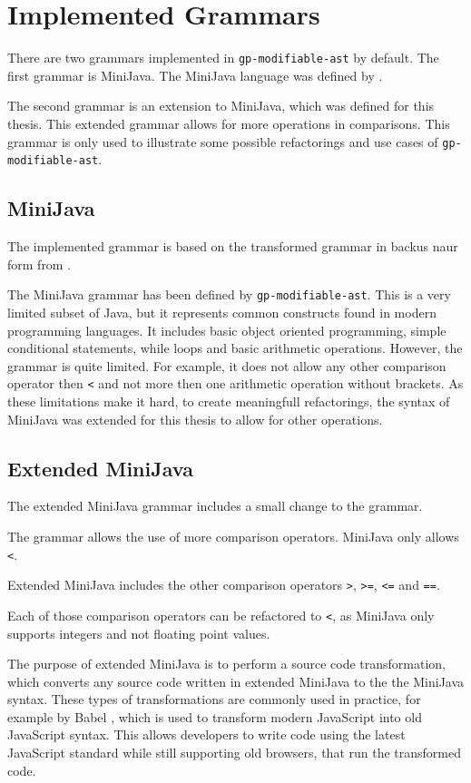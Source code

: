 
\section{Implemented Grammars}

There are two grammars implemented in \verb|gp-modifiable-ast| by default. 
The first grammar is MiniJava. The MiniJava language was defined by \cite{Appel2002-kleene}. 

The second grammar is an extension to MiniJava, which was defined for this thesis. This extended grammar allows for more operations in comparisons.
This grammar is only used to illustrate some possible refactorings and use cases of \verb|gp-modifiable-ast|.

\subsection{MiniJava}

The implemented grammar is based on the transformed grammar in backus naur form from \cite{minijava_bnf}.

The MiniJava grammar has been defined by \verb|gp-modifiable-ast|. 
This is a very limited subset of Java, but it represents common constructs found in modern programming languages.
It includes basic object oriented programming, simple conditional statements, while loops and basic arithmetic operations. 
However, the grammar is quite limited. For example, it does not allow any other comparison operator then \lstinline|<| and not more 
then one arithmetic operation without brackets. As these limitations make it hard, to create meaningfull refactorings, the syntax of MiniJava was extended for this thesis to allow for other operations.

\subsection{Extended MiniJava}

The extended MiniJava grammar includes a small change to the grammar.

The grammar allows the use of more comparison operators. MiniJava only allows \lstinline|<|.

Extended MiniJava includes the other comparison operators \lstinline|>|, \lstinline|>=|, \lstinline|<=| and \lstinline|==|.

Each of those comparison operators can be refactored to \lstinline|<|, as MiniJava only supports integers and not floating point values.

The purpose of extended MiniJava is to perform a source code transformation, which converts any source code written in extended MiniJava to the
the MiniJava syntax. These types of transformations are commonly used in practice, for example by Babel \cite{babeljs}, which is used to transform
modern JavaScript into old JavaScript syntax. This allows developers to write code using the latest JavaScript standard while still supporting old browsers,
that run the transformed code.